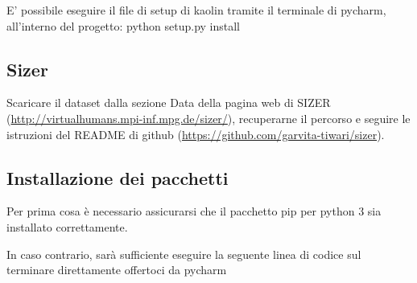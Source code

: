 






\medskip

E’ possibile eseguire il file di setup di kaolin tramite il terminale di pycharm, all’interno del progetto:
python setup.py install

\medskip



\subsection{Sizer}

\medskip

Scaricare il dataset dalla sezione Data della pagina web di SIZER (\url{http://virtualhumans.mpi-inf.mpg.de/sizer/}), recuperarne il percorso e seguire le istruzioni del README di github (\url{https://github.com/garvita-tiwari/sizer}).



\medskip

\subsection{Installazione dei pacchetti}

\medskip

Per prima cosa è necessario assicurarsi che il pacchetto pip per python 3 sia installato correttamente.

\medskip

In caso contrario, sarà sufficiente eseguire la seguente linea di codice sul terminare direttamente offertoci da pycharm






